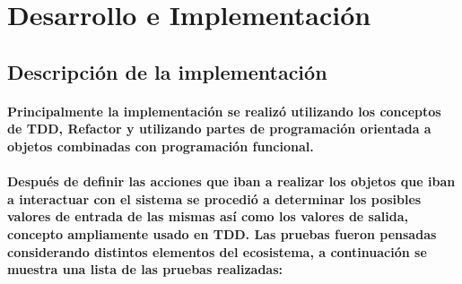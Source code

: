 \section{Desarrollo e Implementación}
  \subsection{Descripción de la implementación}    
    \paragraph{Principalmente la implementación se realizó utilizando los conceptos de TDD, Refactor y utilizando partes de programación orientada a objetos combinadas con programación funcional.}
    \paragraph{Después de definir las acciones que iban a realizar los objetos que iban a interactuar con el sistema se procedió a determinar los posibles valores de entrada de las mismas así como los valores de salida, concepto ampliamente usado en TDD. Las pruebas fueron pensadas considerando distintos elementos del ecosistema, a continuación se muestra una lista de las pruebas realizadas:}
